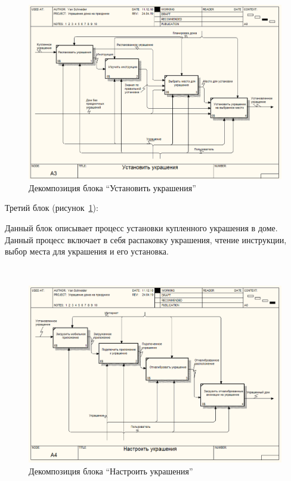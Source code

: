  ~
\begin{figure}[H]
\centering
	\includegraphics[scale=0.45]{figures/functionalModel/a3_install.png}
	\caption{Декомпозиция блока \enquote{Установить украшения}}
	\label{fig:analysis:functionalModel:a3_install}
\end{figure}

Третий блок (рисунок~\ref{fig:analysis:functionalModel:a3_install}):

Данный блок описывает процесс установки купленного украшения в доме. Данный процесс включает в себя распаковку украшения, чтение инструкции, выбор места для украшения и его установка.

 ~
\begin{figure}[H]
\centering
	\includegraphics[scale=0.45]{figures/functionalModel/a4_settings.png}
	\caption{Декомпозиция блока \enquote{Настроить украшения}}
	\label{fig:analysis:functionalModel:a4_settings}
\end{figure}

